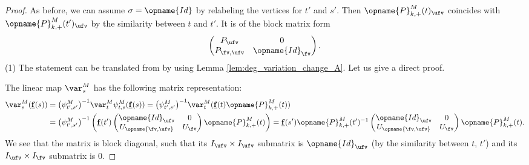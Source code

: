 \documentclass[pdftex]{sigma}
\newcommand{\Iufv}{I_{\ufv}}
\newcommand{\Id}{{\opname{Id}}}
\newcommand{\trans}{\opname{P}}
\newcommand{\ff}{\mathbf{f}}
\newcommand{\uff}{\underline{\ff}}
\newcommand{\low}{\opname{\fv,\ufv}}
\numberwithin{equation}{section}
\begin{document}
\begin{proof}
As before, we can assume $\sigma=\Id$ by relabeling the vertices
for $t'$ and $s'$. Then $\trans_{k,+}^{M}(t)_{\ufv}$ coincides
with $\trans_{k,+}^{M}(t')_{\ufv}$ by the similarity between $t$
and $t'$. It is of the block matrix form
\[\begin{pmatrix}
P_{\ufv} & 0\\
P_{\fv,\ufv} & \Id_{\fv}
\end{pmatrix}.\]
(1) The statement can be translated from \cite[Proposition 5.1.6]{qin2020dual}
by using Lemma \ref{lem:deg_variation_change_A}. Let us give a direct
proof.

The linear map $\var_{s}^{M}$ has the following matrix representation:
\begin{align*}
\var_{s}^{M}(\uff(s)) & =\big(\psi_{t',s'}^{M}\big)^{-1}\var_{t}^{M}\psi_{t,s}^{M}(\uff(s))=\big(\psi_{t',s'}^{M}\big)^{-1}\var_{t}^{M}(\uff(t)\trans_{k,+}^{M}(t))\\
 & =\big(\psi_{t',s'}^{M}\big)^{-1}\left(\uff(t')\begin{pmatrix}
\Id_{\ufv} & 0\\
U_{\low} & U_{\fv}
\end{pmatrix}\trans_{k,+}^{M}(t)\right)=\uff(s')\trans_{k,+}^{M}(t')^{-1}\begin{pmatrix}
\Id_{\ufv} & 0\\
U_{\low} & U_{\fv}
\end{pmatrix}\trans_{k,+}^{M}(t).
\end{align*}
We see that the matrix \smash{$\trans_{k,+}^{M}(t')^{-1}\left(\begin{smallmatrix}
\Id_{\ufv} & 0\\
U_{\low} & U_{\fv}
\end{smallmatrix}\right)\trans_{k,+}^{M}(t)$} is block diagonal, such that its $\Iufv\times\Iufv$ submatrix is
$\Id_{\ufv}$ (by the similarity between $t$, $t'$) and its $I_{\ufv}\times I_{\fv}$
submatrix is $0$.


\end{proof}
\end{document}
